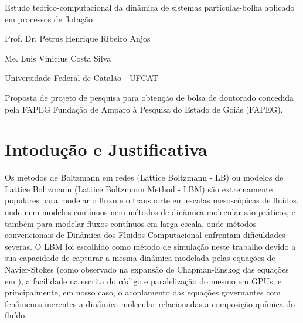 \documentclass[12pt]{article}
\begin{document}
\begin{titlepage}
  \begin{center}
    \vspace*{1cm}
    \Huge{Estudo teórico-computacional da dinâmica de sistemas partículas-bolha aplicado em processos de flotação}

    \vspace{2cm}
    \Large{Prof. Dr. Petrus Henrique Ribeiro Anjos}

    \vspace{0.5cm}
    \Large{Me. Luis Vinicius Costa Silva}

    \vspace{0.5cm}
    \Large{Universidade Federal de Catalão - UFCAT}

  \end{center}
  
  
        \vfill
        
        Proposta de projeto de pesquisa para obtenção de bolsa de doutorado concedida pela FAPEG  Fundação de Amparo à Pesquisa do Estado de Goiás (FAPEG).
        
        \vspace{0.8cm}
          
  
\end{titlepage}


\newpage
\tableofcontents %

\newpage
{} %
\doublespacing %

\section{Intodução e Justificativa}
Os métodos de Boltzmann em redes (Lattice Boltzmann - LB) ou modelos de Lattice Boltzmann (Lattice Boltzmann Method - LBM) são extremamente populares para modelar o fluxo e o transporte em escalas mesoscópicas de fluídos, onde nem modelos contínuos nem métodos de dinâmica molecular são práticos, e também para modelar fluxos contínuos em larga escala, onde métodos convencionais de Dinâmica dos Fluidos Computacional enfrentam dificuldades severas. O LBM foi escolhido como método de simulação neste trabalho devido a sua capacidade de capturar a mesma dinâmica modelada pelas equações de Navier-Stokes (como observado na expansão de Chapman-Enskog das equações em \cite{zhang2014lattice}), a facilidade na escrita do código e paralelização do mesmo em GPUs\cite{schlauch2013comparison}, e principalmente, em nosso caso, o acoplamento das equações governantes com fenômenos inerentes a dinâmica molecular relacionadas a composição química do fluído\cite{ning2016upscaling}.\newline
\end{document}
